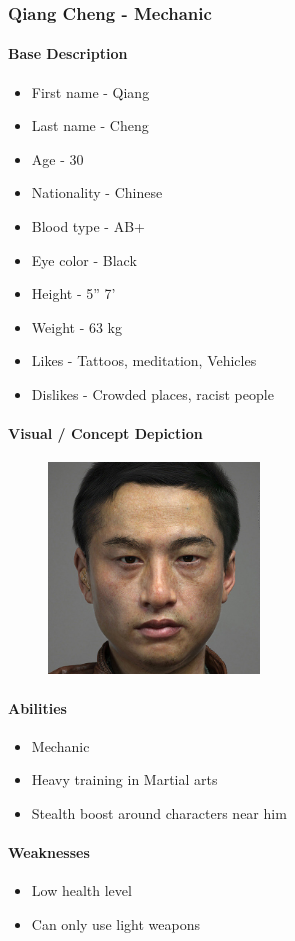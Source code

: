 \subsubsection{Qiang Cheng - Mechanic}
	\paragraph{Base Description}\mbox{}
		\begin{itemize}
			\item First name - Qiang
			\item Last name - Cheng
			\item Age - 30
			\item Nationality - Chinese
			\item Blood type - AB+
			\item Eye color - Black
			\item Height - 5” 7’
			\item Weight - 63 kg
			\item Likes - Tattoos, meditation, Vehicles
			\item Dislikes - Crowded places, racist people
		\end{itemize}
	\paragraph{Visual / Concept Depiction}\mbox{}
		\begin{figure}[H]
			\centering
			\includegraphics[width=0.5\textwidth]{images/characters/cheng}
		\end{figure}
	\paragraph{Abilities}\mbox{}
		\begin{itemize}
			\item Mechanic
			\item Heavy training in Martial arts
			\item Stealth boost around characters near him
		\end{itemize}
	\paragraph{Weaknesses}\mbox{}
		\begin{itemize}
			\item Low health level
			\item Can only use light weapons
		\end{itemize}